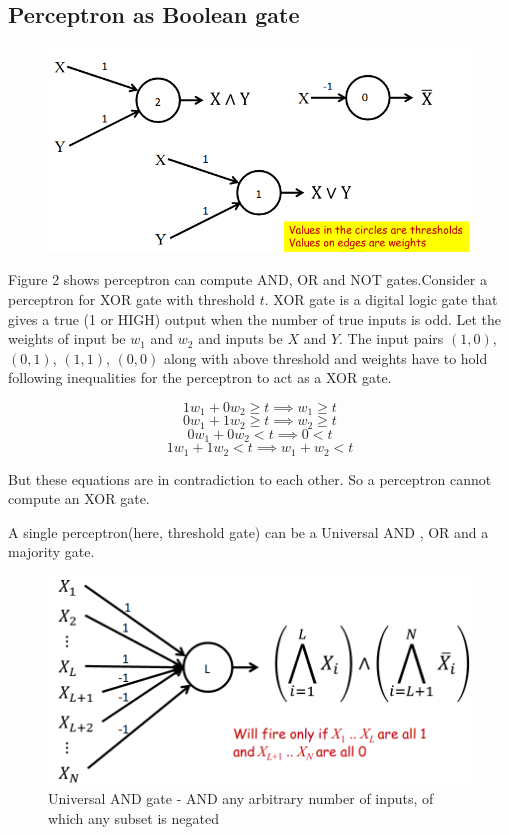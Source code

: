 \documentclass[12pt]{article}
\begin{document}
\subsection{Perceptron as Boolean gate}




\begin{figure}[h]
	\centering
	\includegraphics[width=0.7\linewidth, height=0.3\textheight]{img/gate}
	\caption{}
	\label{fig:gate}
\end{figure}


Figure 2 shows perceptron can compute AND, OR and NOT gates.Consider a perceptron for XOR gate with threshold $t$.
XOR gate is a digital logic gate that gives a true (1 or HIGH) output when the number of true inputs is odd. Let the  weights of  input be $w_1$ and $w_2$ and inputs be $X$ and $Y$. The input pairs  $(1,0)$, $(0,1)$, $(1,1)$, $(0,0)$ along with above threshold and weights have to hold  following inequalities for the perceptron to act as a XOR gate.

$$1w_1 + 0w_2 \geq t \implies w_1 \geq t$$
$$0w_1 + 1w_2 \geq t \implies w_2 \geq t$$
$$0w_1 + 0w_2 < t    \implies 0 < t$$
$$1w_1 + 1w_2 < t    \implies w_1 + w_2 <t $$

But these equations are in contradiction to each other. So a perceptron cannot compute an XOR gate.

A single perceptron(here, threshold gate) can be a Universal AND , OR and a majority gate.

\begin{figure}[h]
	\centering
	\includegraphics[width=0.4\linewidth]{img/and}
	\caption{Universal AND gate - AND any arbitrary number of inputs, of which any subset is negated}
	\label{fig:and}
\end{figure}
\end{document}
